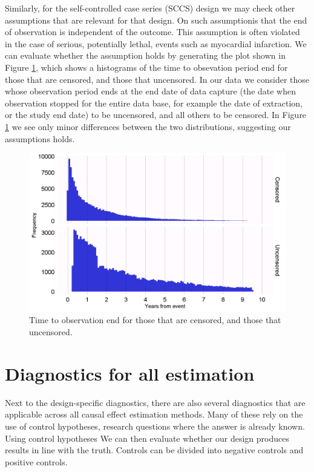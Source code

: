 \documentclass[]{book}
\begin{document}
Similarly, for the self-controlled case series (SCCS) design we may
check other assumptions that are relevant for that design. On such
assumptionis that the end of observation is independent of the outcome.
This assumption is often violated in the case of serious, potentially
lethal, events such as myocardial infarction. We can evaluate whether
the assumption holds by generating the plot shown in Figure
\ref{fig:timeToObsEnd}, which shows a histograms of the time to
obsevation period end for those that are censored, and those that
uncensored. In our data we consider those whose observation period ends
at the end date of data capture (the date when observation stopped for
the entire data base, for example the date of extraction, or the study
end date) to be uncensored, and all others to be censored. In Figure
\ref{fig:timeToObsEnd} we see only minor differences between the two
distributions, suggesting our assumptions holds.

\begin{figure}

{\centering \includegraphics[width=1\linewidth]{images/MethodValidity/timeToObsEnd} 

}

\caption{Time to observation end for those that are censored, and those that uncensored.}\label{fig:timeToObsEnd}
\end{figure}

\section{Diagnostics for all
estimation}\label{diagnostics-for-all-estimation}

Next to the design-specific diagnostics, there are also several
diagnostics that are applicable across all causal effect estimation
methods. Many of these rely on the use of control hypotheses, research
questions where the answer is already known. Using control hypotheses We
can then evaluate whether our design produces results in line with the
truth. Controls can be divided into negative controls and positive
controls.
\end{document}
